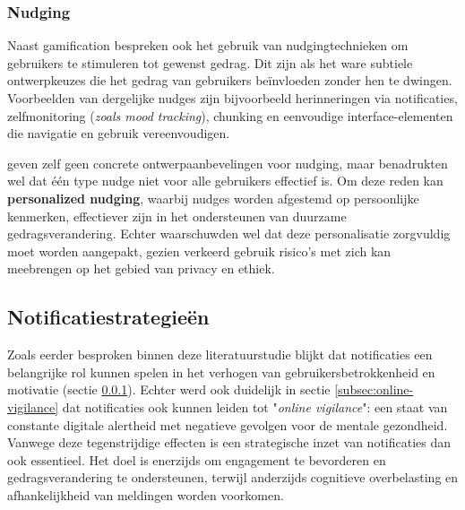 \vspace{1em}

\subsubsection{Nudging}
\label{subsubsec:nudging}

\vspace{1em}

Naast gamification bespreken \textcite{Auf2021} ook het gebruik van nudgingtechnieken om gebruikers te stimuleren tot gewenst gedrag. Dit zijn als het ware subtiele ontwerpkeuzes die het gedrag van gebruikers beïnvloeden zonder hen te dwingen. Voorbeelden van dergelijke nudges zijn bijvoorbeeld herinneringen via notificaties, zelfmonitoring (\textit{zoals mood tracking}), chunking en eenvoudige interface-elementen die navigatie en gebruik vereenvoudigen.

\vspace{1em}

\textcite{Auf2021} geven zelf geen concrete ontwerpaanbevelingen voor nudging, maar benadrukten wel dat één type nudge niet voor alle gebruikers effectief is. Om deze reden kan \textbf{personalized nudging}, waarbij nudges worden afgestemd op persoonlijke kenmerken, effectiever zijn in het ondersteunen van duurzame gedragsverandering. Echter waarschuwden \textcite{Auf2021} wel dat deze personalisatie zorgvuldig moet worden aangepakt, gezien verkeerd gebruik risico’s met zich kan meebrengen op het gebied van privacy en ethiek.

\vspace{1em}
\vspace{1em}

\subsection{Notificatiestrategieën}
\label{subsec:notificatie-strat}

\vspace{1em}

Zoals eerder besproken binnen deze literatuurstudie blijkt dat notificaties een belangrijke rol kunnen spelen in het verhogen van gebruikersbetrokkenheid en motivatie (sectie \ref{subsubsec:nudging}). Echter werd ook duidelijk in sectie \ref{subsec:online-vigilance} dat notificaties ook kunnen leiden tot "\textit{online vigilance}": een staat van constante digitale alertheid met negatieve gevolgen voor de mentale gezondheid. Vanwege deze tegenstrijdige effecten is een strategische inzet van notificaties dan ook essentieel. Het doel is enerzijds om engagement te bevorderen en gedragsverandering te ondersteunen, terwijl anderzijds cognitieve overbelasting en afhankelijkheid van meldingen worden voorkomen.

